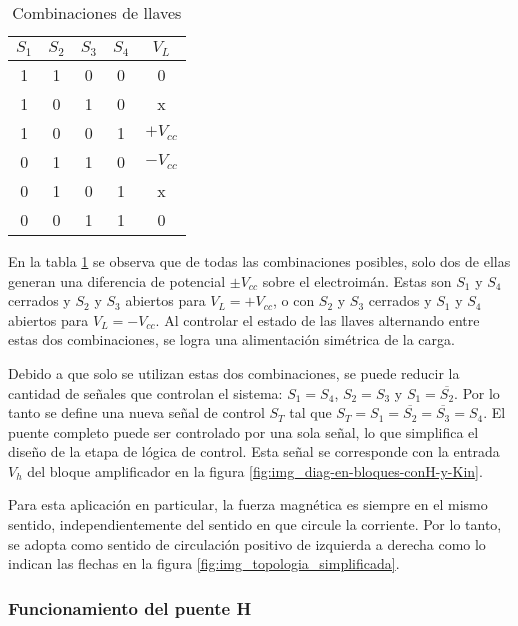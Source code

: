 \begin{table}[H]
	\begin{center}
		\begin{tabular}{| c | c | c | c | c |}
			\hline
			$S_1$ & $S_2$ & $S_3$ & $S_4$ & $V_L$ \\ \hline
			1 & 1 & 0 & 0 & 0 \\ \hline 
			1 & 0 & 1 & 0 & x \\ \hline 
			1 & 0 & 0 & 1 & $+V_{cc}$ \\ \hline 
			0 & 1 & 1 & 0 & $-V_{cc}$ \\ \hline 
			0 & 1 & 0 & 1 & x \\ \hline 
			0 & 0 & 1 & 1 & 0 \\ \hline 
		\end{tabular}
		\caption{Combinaciones de llaves}
		\label{tab_llaves}
	\end{center}
\end{table}

En la tabla \ref{tab_llaves} se observa que de todas las combinaciones posibles, solo dos de ellas generan una diferencia de potencial $\pm V_{cc}$ sobre el electroimán. Estas son  $S_1$ y $S_4$ cerrados y $S_2$ y $S_3$ abiertos para $V_L=+V_{cc}$, o con $S_2$ y $S_3$ cerrados y $S_1$ y $S_4$ abiertos para $V_L=-V_{cc}$. Al controlar el estado de las llaves alternando entre estas dos combinaciones, se logra una alimentación simétrica de la carga.

Debido a que solo se utilizan estas dos combinaciones, se puede reducir la cantidad de señales que controlan el sistema: $S_1=S_4$, $S_2=S_3$ y $S_1=\overline{S_2}$. Por lo tanto se define una nueva señal de control $S_T$ tal que $S_T=S_1=\overline{S_2}=\overline{S_3}=S_4$. El puente completo puede ser controlado por una sola señal, lo que simplifica el diseño de la etapa de lógica de control. Esta señal se corresponde con la entrada $V_h$ del bloque amplificador en la figura \ref{fig:img_diag-en-bloques-conH-y-Kin}.

Para esta aplicación en particular, la fuerza magnética es siempre en el mismo sentido, independientemente del sentido en que circule la corriente. Por lo tanto, se adopta como sentido de circulación positivo de izquierda a derecha como lo indican las flechas en la figura \ref{fig:img_topologia_simplificada}. 



\subsubsection{Funcionamiento del puente H}

